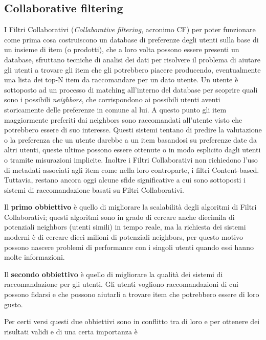 \subsection{Collaborative filtering}
I Filtri Collaborativi (\textit{Collaborative filtering}, acronimo CF) per poter funzionare come prima cosa costruiscono un database di preferenze 
degli utenti sulla base di un insieme di item (o prodotti), che a loro volta possono essere presenti un database, 
sfruttano tecniche di analisi dei dati per risolvere il problema di aiutare gli utenti a trovare gli item che gli potrebbero piacere 
producendo, eventualmente una lista dei top-N item da raccomandare per un dato utente.
Un utente è sottoposto ad un processo di matching all'interno del database per scoprire quali sono i possibili \textit{neighbors},
che corrispondono ai possibili utenti aventi storicamente delle preferenze in comune al lui. A questo punto gli item maggiormente 
preferiti dai neighbors sono raccomandati all'utente visto che potrebbero essere di suo interesse.\hfill\break
Questi sistemi tentano di predire la valutazione o la preferenza che un utente darebbe a un item basandosi su preferenze date da altri 
utenti, queste ultime possono essere ottenute o in modo esplicito dagli utenti o tramite misurazioni implicite.
Inoltre i Filtri Collaborativi non richiedono l'uso di metadati associati agli item come nella loro controparte, i filtri Content-based.\hfill\break
Tuttavia, restano ancora oggi alcune sfide significative a cui sono sottoposti i sistemi di raccomandazione basati su 
Filtri Collaborativi.
\begin{description}
    \item Il \textbf{primo obbiettivo} è quello di migliorare la scalabilità degli algoritmi di Filtri Collaborativi; questi algoritmi sono in grado di cercare 
    anche diecimila di potenziali neighbors (utenti simili) in tempo reale, ma la richiesta dei sistemi moderni è di cercare dieci milioni di 
    potenziali neighbors, per questo motivo possono nascere problemi di performance con i singoli utenti quando essi hanno molte informazioni.
    \item Il \textbf{secondo obbiettivo} è quello di migliorare la qualità dei sistemi di raccomandazione per gli utenti. Gli utenti vogliono 
    raccomandazioni di cui possono fidarsi e che possono aiutarli a trovare item che potrebbero essere di loro gusto.
\end{description}
Per certi versi questi due obbiettivi sono in conflitto tra di loro e per ottenere dei risultati validi e di una certa importanza è 
